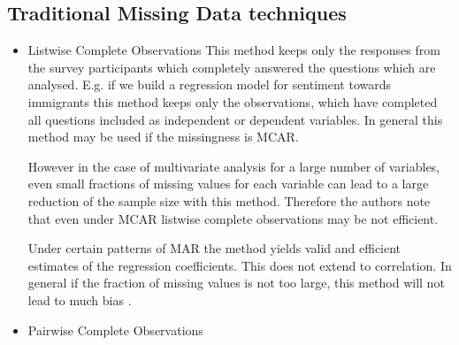 \subsection{Traditional Missing Data techniques} 

\begin{itemize}
\item Listwise Complete Observations
This method keeps only the responses from the survey participants which completely answered the questions which are analysed. E.g. if we build a regression model for sentiment towards immigrants this method keeps only the observations, which have completed all questions included as independent or dependent variables.
In general this method may be used if the missingness is MCAR. \par However in the case of multivariate analysis for a large number of variables, even small fractions of missing values for each variable can lead to a large reduction of the sample size with this method. Therefore the authors note that even under MCAR listwise complete observations may be not efficient. \par Under certain patterns of MAR the method yields valid and efficient estimates of the regression coefficients. This does not extend to correlation. In general if the fraction of missing values is not too large, this method will not lead to much bias \cite{schafer2002missing}.  
\item Pairwise Complete Observations


\end{itemize}
